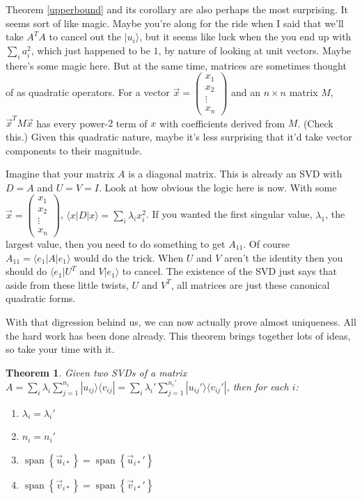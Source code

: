 \documentclass{amsbook}
\newtheorem{theorem}{Theorem}
\begin{document}
Theorem \ref{upperbound} and its corollary are also perhaps the most surprising.  It seems sort of like magic.  Maybe you're along for the ride when I said that we'll take $A^TA$ to cancel out the $|u_i\rangle$, but it seems like luck when the you end up with $\sum_ia_i^2$, which just happened to be $1$, by nature of looking at unit vectors.  Maybe there's some magic here.  But at the same time, matrices are sometimes thought of as quadratic operators.  For a vector $\vec x=\left(\begin{array}{c}x_1\\x_2\\\vdots\\x_n\end{array}\right)$ and an $n\times n$ matrix $M$, $\vec x^TM\vec x$ has every power-$2$ term of $x$ with coefficients derived from $M$.  (Check this.)  Given this quadratic nature, maybe it's less surprising that it'd take vector components to their magnitude.

Imagine that your matrix $A$ is a diagonal matrix.  This is already an SVD with $D=A$ and $U=V=I$.  Look at how obvious the logic here is now.  With some $\vec x=\left(\begin{array}{c}x_1\\x_2\\\vdots\\x_n\end{array}\right)$, $\langle x|D|x\rangle=\sum_i\lambda_ix_i^2$.  If you wanted the first singular value, $\lambda_1$, the largest value, then you need to do something to get $A_{11}$.  Of course $A_{11}=\langle e_1|A|e_1\rangle$ would do the trick.  When $U$ and $V$ aren't the identity then you should do $\langle e_1|U^T$ and $V|e_1\rangle$ to cancel.  The existence of the SVD just says that aside from these little twists, $U$ and $V^T$, all matrices are just these canonical quadratic forms.

With that digression behind us, we can now actually prove almost uniqueness.  All the hard work has been done already.  This theorem brings together lots of ideas, so take your time with it.

\begin{theorem}
Given two SVDs of a matrix $A=\sum_i\lambda_i\sum_{j=1}^{n_i}|u_{ij}\rangle\langle v_{ij}|=\sum_i\lambda_i'\sum_{j=1}^{n_i'}|u_{ij}'\rangle\langle v_{ij}'|$, then for each $i$:

\begin{enumerate}
\item $\lambda_i=\lambda_i'$
\item $n_i=n_i'$
\item $\operatorname{span}\left\{\vec u_{i*}\right\}=\operatorname{span}\left\{\vec u_{i*}'\right\}$
\item $\operatorname{span}\left\{\vec v_{i*}\right\}=\operatorname{span}\left\{\vec v_{i*}'\right\}$
\end{enumerate}
\end{theorem}
\end{document}
